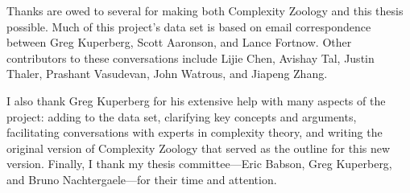 Thanks are owed to several for making both Complexity Zoology and this thesis 
possible. Much of this project's data set is based on email correspondence between 
Greg Kuperberg, Scott Aaronson, and Lance Fortnow. Other contributors to these 
conversations include Lijie Chen, Avishay Tal, Justin Thaler, Prashant Vasudevan, 
John Watrous, and Jiapeng Zhang.

I also thank Greg Kuperberg for his extensive help with many aspects of the project:
adding to the data set, clarifying key concepts and arguments, facilitating 
conversations with experts in complexity theory, and writing the original version of
Complexity Zoology that served as the outline for this new version. Finally, I thank
my thesis committee---Eric Babson, Greg Kuperberg, and Bruno Nachtergaele---for 
their time and attention.